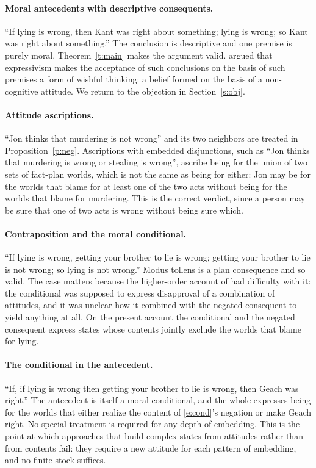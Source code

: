 \documentclass{situationist-preprint}
\begin{document}
\paragraph{Moral antecedents with descriptive consequents.} \enquote{If lying is wrong, then Kant was right about something; lying is wrong; so Kant was right about something.} The conclusion is descriptive and one premise is purely moral. Theorem~\ref{t:main} makes the argument valid. \citet{Dorr2002} argued that expressivism makes the acceptance of such conclusions on the basis of such premises a form of wishful thinking: a belief formed on the basis of a non-cognitive attitude. We return to the objection in Section~\ref{s:obj}.

\paragraph{Attitude ascriptions.} \enquote{Jon thinks that murdering is not wrong} and its two neighbors are treated in Proposition~\ref{p:neg}. Ascriptions with embedded disjunctions, such as \enquote{Jon thinks that murdering is wrong or stealing is wrong}, ascribe being for the union of two sets of fact-plan worlds, which is not the same as being for either: Jon may be for the worlds that blame for at least one of the two acts without being for the worlds that blame for murdering. This is the correct verdict, since a person may be sure that one of two acts is wrong without being sure which.

\paragraph{Contraposition and the moral conditional.} \enquote{If lying is wrong, getting your brother to lie is wrong; getting your brother to lie is not wrong; so lying is not wrong.} Modus tollens is a plan consequence and so valid. The case matters because the higher-order account of \citet{Blackburn1984} had difficulty with it: the conditional was supposed to express disapproval of a combination of attitudes, and it was unclear how it combined with the negated consequent to yield anything at all. On the present account the conditional and the negated consequent express states whose contents jointly exclude the worlds that blame for lying.

\paragraph{The conditional in the antecedent.} \enquote{If, if lying is wrong then getting your brother to lie is wrong, then Geach was right.} The antecedent is itself a moral conditional, and the whole expresses being for the worlds that either realize the content of \ref{e:cond}'s negation or make Geach right. No special treatment is required for any depth of embedding. This is the point at which approaches that build complex states from attitudes rather than from contents fail: they require a new attitude for each pattern of embedding, and no finite stock suffices.
\end{document}
